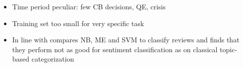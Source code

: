 
\begin{itemize}
	\item Time period peculiar: few CB decisions, QE, crisis
	\item Training set too small for very specific task
	\item In line with \textcite{Pang.2002} compares NB, ME and SVM to classify reviews and finds that they perform not as good for sentiment classification as on classical topic-based categorization
\end{itemize}